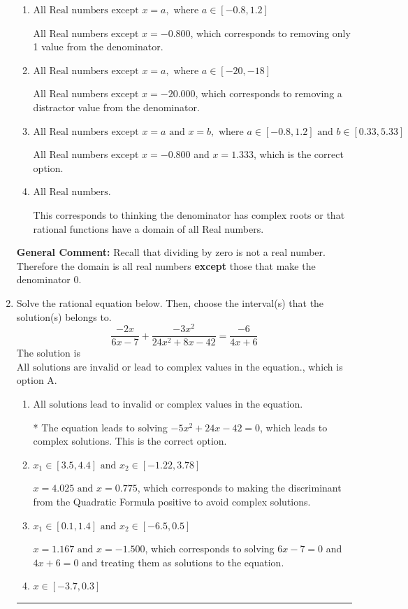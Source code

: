 \documentclass{extbook}[14pt]
\newcommand{\litem}[1]{\item #1

\rule{\textwidth}{0.4pt}}
\begin{document}
\begin{enumerate}
{\begin{enumerate}[label=\Alph*.]
All Real numbers except $x = -20.000$ and $x = 12.000$, which corresponds to not factoring the denominator correctly.
\item \( \text{All Real numbers except } x = a, \text{ where } a \in [-0.8, 1.2] \)

All Real numbers except $x = -0.800$, which corresponds to removing only 1 value from the denominator.
\item \( \text{All Real numbers except } x = a, \text{ where } a \in [-20, -18] \)

All Real numbers except $x = -20.000$, which corresponds to removing a distractor value from the denominator.
\item \( \text{All Real numbers except } x = a \text{ and } x = b, \text{ where } a \in [-0.8, 1.2] \text{ and } b \in [0.33, 5.33] \)

All Real numbers except $x = -0.800$ and $x = 1.333$, which is the correct option.
\item \( \text{All Real numbers.} \)

This corresponds to thinking the denominator has complex roots or that rational functions have a domain of all Real numbers.
\end{enumerate}

\textbf{General Comment:} Recall that dividing by zero is not a real number. Therefore the domain is all real numbers \textbf{except} those that make the denominator 0.
}
\litem{
Solve the rational equation below. Then, choose the interval(s) that the solution(s) belongs to.
\[ \frac{-2x}{6x -7} + \frac{-3x^{2}}{24x^{2} +8 x -42} = \frac{-6}{4x + 6} \]The solution is \( \text{All solutions are invalid or lead to complex values in the equation.} \), which is option A.\begin{enumerate}[label=\Alph*.]
\item \( \text{All solutions lead to invalid or complex values in the equation.} \)

* The equation leads to solving $-5x^{2} +24 x -42=0$, which leads to complex solutions. This is the correct option.
\item \( x_1 \in [3.5, 4.4] \text{ and } x_2 \in [-1.22,3.78] \)

$x = 4.025 \text{ and } x = 0.775$, which corresponds to making the discriminant from the Quadratic Formula positive to avoid complex solutions.
\item \( x_1 \in [0.1, 1.4] \text{ and } x_2 \in [-6.5,0.5] \)

$x = 1.167 \text{ and } x = -1.500$, which corresponds to solving $6x -7 = 0$ and $4x + 6 = 0$ and treating them as solutions to the equation.
\item \( x \in [-3.7,0.3] \)


\end{enumerate}}
\end{enumerate}
\end{document}
